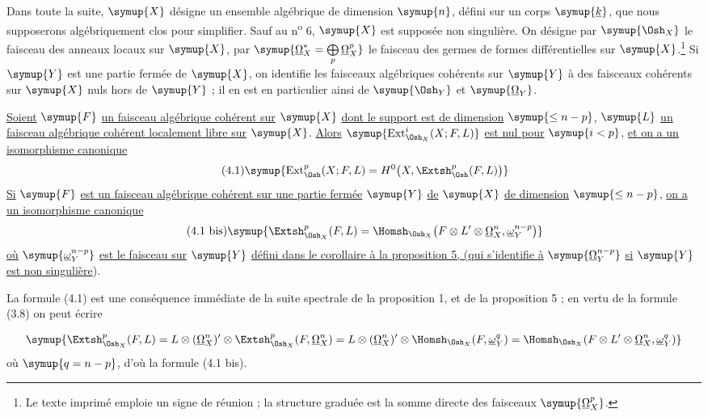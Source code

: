 Dans toute la suite, $\symup{X}$ désigne un ensemble algébrique de dimension $\symup{n}$, défini
sur un corps $\symup{\underline{k}}$, que nous supposerons algébriquement clos pour simplifier. Sauf
au n\textsuperscript{o} 6, $\symup{X}$ est supposée non singulière. On désigne par
$\symup{\Osh_X}$ le faisceau des anneaux locaux sur $\symup{X}$, par
$\symup{\underline{\Omega}_X^{*}=\bigoplus\limits_p\underline{\Omega}_X^{p}}$ le faisceau des germes de formes différentielles sur $\symup{X}$.\footnote{Le texte
imprimé emploie un signe de réunion ; la structure graduée est la somme directe
des faisceaux $\symup{\underline{\Omega}_X^p}$.} Si $\symup{Y}$ est une partie fermée de $\symup{X}$, on identifie
les faisceaux algébriques cohérents sur $\symup{Y}$ à des faisceaux cohérents sur $\symup{X}$
nuls hors de $\symup{Y}$ ; il en est en particulier ainsi de $\symup{\Osh_Y}$ et $\symup{\underline{\Omega}_Y}$.

 \uline{Soient} $\symup{F}$ \uline{un faisceau algébrique cohérent sur} $\symup{X}$ \uline{dont le
support est de dimension} $\symup{\leq n-p}$, $\symup{L}$ \uline{un faisceau algébrique cohérent
localement libre sur} $\symup{X}$. \uline{Alors} $\symup{\operatorname{Ext}_{\Osh_X}^{i}(X;F,L)}$ \uline{est nul
pour} $\symup{i<p}$, \uline{et on a un isomorphisme canonique}
\begin{equation}\tag{4.1}
  \symup{\operatorname{Ext}_{\Osh}^{p}(X;F,L)
  =H^{0}\bigl(X,\Extsh_{\Osh}^{p}(F,L)\bigr)}
\end{equation}
\uline{Si} $\symup{F}$ \uline{est un faisceau algébrique cohérent sur une partie fermée} $\symup{Y}$ \uline{de} $\symup{X}$ \uline{de
dimension} $\symup{\leq n-p}$, \uline{on a un isomorphisme canonique}
\begin{equation}\tag{4.1 bis}
  \symup{\Extsh_{\Osh_X}^{p}(F,L)
  =\Homsh_{\Osh_X}\!\left(
    F\otimes L'\otimes\underline{\Omega}_X^{n},\underline{\omega}_Y^{n-p}
  \right)}
\end{equation}
\uline{où} $\symup{\underline{\omega}_Y^{n-p}}$ \uline{est le faisceau sur} $\symup{Y}$ \uline{défini dans le corollaire à la
proposition 5, (qui s'identifie à} $\symup{\underline{\Omega}_Y^{n-p}}$ \uline{si} $\symup{Y}$ \uline{est non singulière}).

La formule (4.1) est une conséquence immédiate de la suite spectrale de la
proposition 1, et de la proposition 5 ; en vertu de la formule (3.8) on peut
écrire

\[
\symup{\Extsh_{\Osh_X}^{p}(F,L)
=L\otimes(\underline{\Omega}_X^{n})'\otimes
  \Extsh_{\Osh_X}^{p}(F,\underline{\Omega}_X^{n})
=L\otimes(\underline{\Omega}_X^{n})'\otimes
  \Homsh_{\Osh_X}(F,\underline{\omega}_Y^{q})
=\Homsh_{\Osh_X}\!\left(
  F\otimes L'\otimes\underline{\Omega}_X^{n},\underline{\omega}_Y^{q}\right)}
\]
où $\symup{q=n-p}$, d'où la formule (4.1 bis).

